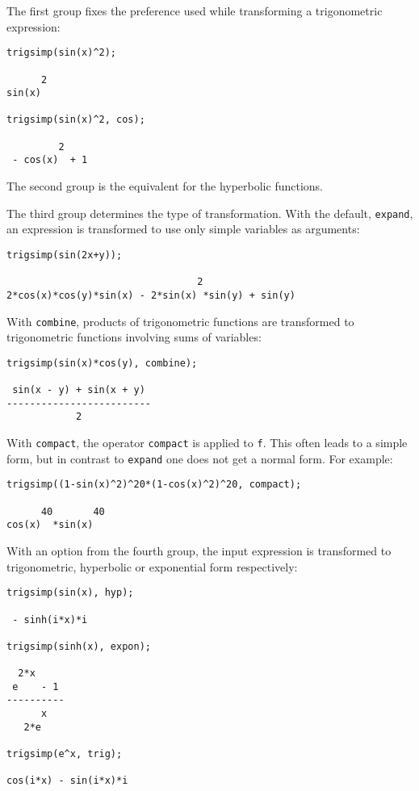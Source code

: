The first group fixes the preference used while transforming a
trigonometric expression:
\begin{verbatim}
trigsimp(sin(x)^2);

      2
sin(x)

trigsimp(sin(x)^2, cos);

         2
 - cos(x)  + 1
\end{verbatim}
The second group is the equivalent for the hyperbolic functions.

The third group determines the type of transformation.  With the
default, \texttt{expand}, an expression is transformed to use only
simple variables as arguments:
\begin{verbatim}
trigsimp(sin(2x+y));

                                 2
2*cos(x)*cos(y)*sin(x) - 2*sin(x) *sin(y) + sin(y)
\end{verbatim}
With \texttt{combine}, products of trigonometric functions are
transformed to trig\-onometric functions involving sums of variables:
\begin{verbatim}
trigsimp(sin(x)*cos(y), combine);

 sin(x - y) + sin(x + y)
-------------------------
            2
\end{verbatim}
With \texttt{compact}, the \REDUCE{} operator \texttt{compact}
\cite{hearns} is applied to \texttt{f}.  This often leads to a simple
form, but in contrast to \texttt{expand} one does not get a normal
form. For example:
\begin{verbatim}
trigsimp((1-sin(x)^2)^20*(1-cos(x)^2)^20, compact);

      40       40
cos(x)  *sin(x)
\end{verbatim}

With an option from the fourth group, the input expression is
transformed to trigonometric, hyperbolic or exponential form
respectively:
\begin{verbatim}
trigsimp(sin(x), hyp);

 - sinh(i*x)*i

trigsimp(sinh(x), expon);

  2*x
 e    - 1
----------
      x
   2*e

trigsimp(e^x, trig);

cos(i*x) - sin(i*x)*i
\end{verbatim}

